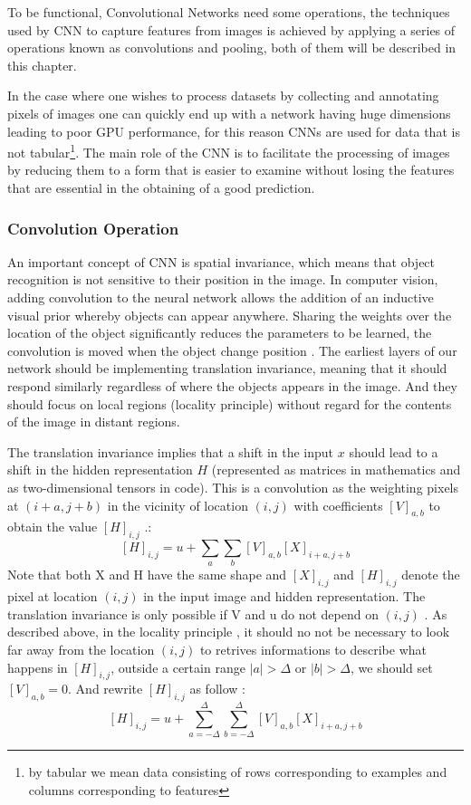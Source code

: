 \documentclass[12pt,a4paper]{scrartcl}
\begin{document}
To be functional, Convolutional Networks need some operations, the techniques used by CNN to capture features from images is achieved by applying a series of operations known as convolutions and pooling, both of them will be described in this chapter. 

In the case where one wishes to process datasets by collecting and annotating pixels of images one can quickly end up with a network having huge dimensions leading to poor GPU performance, for this reason CNNs are used for data that is not tabular\footnote{by tabular we mean data consisting of rows corresponding to examples and columns corresponding to features}\cite{DIDLBook}. The main role of the CNN is to facilitate the processing of images by reducing them to a form that is easier to examine without losing the features that are essential in the obtaining of a good prediction.

\subsubsection{Convolution Operation}
An important concept of CNN is spatial invariance, which means that object recognition is not sensitive to their position in the image. In computer vision, adding convolution to the neural network allows the addition of an inductive visual prior whereby objects can appear anywhere.  Sharing the weights over the location of the object significantly reduces the parameters to be learned, the convolution is moved when the object change position \cite{CNNSpatialLocation}. The earliest layers of our network should be implementing translation invariance, meaning that it should respond similarly  regardless of where the objects appears in the image. And they should focus on local regions (locality principle) without regard for the contents of the image in distant regions. \cite{DIDLBook}

The translation invariance implies that a shift in the input \(x\) should lead to a shift in the hidden representation \(H\) (represented as matrices in mathematics and as two-dimensional tensors in code). 
This is a convolution as the weighting pixels at \((i + a, j + b)\) in the vicinity of location
\((i, j)\) with coefficients \([V]_{a,b}\) to obtain the value \([H]_{i,j}\) .: 
\begin{equation}
\label{eqn:invariance}
[H]_{i,j} = u + \sum_a\sum_b[V]_{a,b}[X]_{i+a,j+b}
\end{equation}
Note that both X and H have the same shape and \([X]_{i,j}\) and \([H]_{i,j}\) denote the pixel at location \((i, j)\) in the input image and hidden representation. The translation invariance is only possible if V and u do not depend on \((i, j)\) \cite{DIDLBook}.
As described above, in the locality principle , it should no not be necessary to look far away from the location \((i, j)\) to retrives informations to describe what happens in \([H]_{i,j}\), outside a certain range \(|a| > \Delta \) or \(|b| > \Delta\), we should set  \([V]_{a,b} = 0\). And rewrite \([H]_{i,j}\) as follow \cite{DIDLBook}:
\begin{equation}
\label{eqn:locality}
[H]_{i,j} = u + \sum_{a=-\Delta}^{\Delta}\sum_{b=-\Delta}^{\Delta}[V]_{a,b}[X]_{i+a,j+b}
\end{equation}
\end{document}
